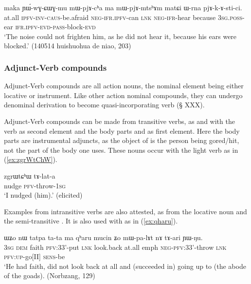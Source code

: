 \begin{exe}
\ex \label{ex:pjAkAstici}
\gll maka ɲɯ́-wɣ-ɕɯɣ-mu mɯ-pjɤ-cʰa ma mɯ-pjɤ-mtsʰɤm matɕi ɯ-rna pjɤ-k-ɤ-sti-ci. \\
at.all \textsc{ipfv}-\textsc{inv}-\textsc{caus}-be.afraid \textsc{neg}-\textsc{ifr.ipfv}-can \textsc{lnk} \textsc{neg}-\textsc{ifr}-hear because \textsc{3sg.poss}-ear \textsc{ifr.ipfv}-\textsc{evd}-\textsc{pass}-block-\textsc{evd} \\
\glt `The noise could not frighten him, as he did not hear it, because his ears were blocked.' (140514 huishuohua de niao, 203)
\end{exe}

\subsubsection{Adjunct-Verb compounds} \label{sec:adjunct.verb.compounds}
Adjunct-Verb compounds are all action nouns, the nominal element being either locative or instrument. Like other action nominal compounds, they can undergo denominal derivation to become quasi-incorporating verb (§ XXX).  

Adjunct-Verb compounds can be made from transitive verbs, as  and  with the verb  as second element and the body parts   and   as first element. Here the body parts are instrumental adjuncts, as the object of  is the person being gored/hit, not the part of the body one uses. These nouns occur with the light verb  as in (\ref{ex:zgrWtChW}). 

\begin{exe}
\ex \label{ex:zgrWtChW}
\gll zgrɯtɕʰɯ tɤ-lat-a \\
nudge \textsc{pfv}-throw-\textsc{1sg} \\
\glt `I nudged (him).' (elicited)
\end{exe}

Examples from intransitive verbs are also attested, as  from the locative noun  and the semi-transitive . It is also used with   as in (\ref{ex:qharu}).

\begin{exe}
\ex \label{ex:qharu}
\gll ɯʑo nɯ  tatpa ta-ta ma qʰaru mucin ʑo mɯ-pa-lɤt nɤ tɤ-ari ɲɯ-ŋu. \\
\textsc{3sg} \textsc{dem} faith \textsc{pfv}:3\fl{}3'-put \textsc{lnk} look.back at.all emph \textsc{neg}-\textsc{pfv}:3\fl{}3'-throw \textsc{lnk} \textsc{pfv}:\textsc{up}-go[II] \textsc{sens}-be \\
\glt `He had faith, did not look back at all and (succeeded in) going up to (the abode of the goads). (Norbzang, 129)
\end{exe}

